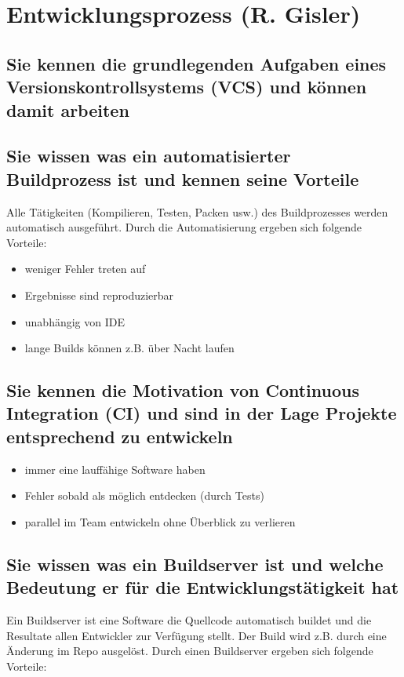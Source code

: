 \section{Entwicklungsprozess (R. Gisler)}
\label{sec:gisler}

\subsection{Sie kennen die grundlegenden Aufgaben eines Versionskontrollsystems (VCS) und können damit arbeiten}
\subsection{Sie wissen was ein automatisierter Buildprozess ist und kennen seine Vorteile}

Alle Tätigkeiten (Kompilieren, Testen, Packen usw.) des Buildprozesses werden automatisch ausgeführt. Durch die Automatisierung ergeben sich folgende Vorteile:

\begin{itemize}
	\item weniger Fehler treten auf
	\item Ergebnisse sind reproduzierbar
	\item unabhängig von IDE
	\item lange Builds können z.B. über Nacht laufen
\end{itemize}

\subsection{Sie kennen die Motivation von Continuous Integration (CI) und sind in der Lage Projekte entsprechend zu entwickeln}

\begin{itemize}
	\item immer eine lauffähige Software haben
	\item Fehler sobald als möglich entdecken (durch Tests)
	\item parallel im Team entwickeln ohne Überblick zu verlieren
\end{itemize}

\subsection{Sie wissen was ein Buildserver ist und welche Bedeutung er für die Entwicklungstätigkeit hat}

Ein Buildserver ist eine Software die Quellcode automatisch buildet und die Resultate allen Entwickler zur Verfügung stellt. Der Build wird z.B. durch eine Änderung im Repo ausgelöst. Durch einen Buildserver ergeben sich folgende Vorteile:

